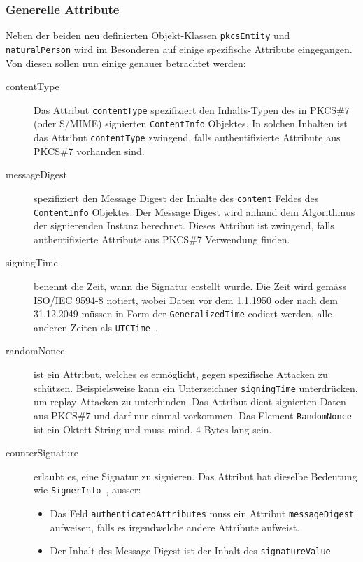 \documentclass[10pt,a4paper]{article}
\begin{document}
\subsubsection{Generelle Attribute}

Neben der beiden neu definierten Objekt-Klassen \texttt{pkcsEntity} und
\texttt{naturalPerson} wird im Besonderen auf einige spezifische Attribute eingegangen.
Von diesen sollen nun einige genauer betrachtet werden:

\begin{description}
    \item[contentType] Das Attribut \texttt{contentType} spezifiziert den Inhalts-Typen
        des in PKCS\#7 (oder S/MIME) signierten \texttt{ContentInfo} Objektes. In solchen
        Inhalten ist das Attribut \texttt{contentType} zwingend, falls authentifizierte
        Attribute aus PKCS\#7 vorhanden sind.
    \item[messageDigest] spezifiziert den Message Digest der Inhalte des \texttt{content}
        Feldes des \texttt{ContentInfo} Objektes. Der Message Digest wird anhand dem
        Algorithmus der signierenden Instanz berechnet. Dieses Attribut ist zwingend,
        falls authentifizierte Attribute aus PKCS\#7 Verwendung finden.
    \item[signingTime] benennt die Zeit, wann die Signatur erstellt wurde. Die Zeit wird
        gemäss ISO/IEC 9594-8 notiert, wobei Daten vor dem 1.1.1950 oder nach dem
        31.12.2049 müssen in Form der \texttt{GeneralizedTime} codiert werden, alle
        anderen Zeiten als \texttt{UTCTime}~\cite[S.12]{pkcs9}.
    \item[randomNonce] ist ein Attribut, welches es ermöglicht, gegen spezifische Attacken
        zu schützen. Beispielsweise kann ein Unterzeichner \texttt{signingTime}
        unterdrücken, um replay Attacken zu unterbinden. Das Attribut dient signierten
        Daten aus PKCS\#7 und darf nur einmal vorkommen. Das Element \texttt{RandomNonce}
        ist ein Oktett-String und muss mind. 4 Bytes lang sein.
    \item[counterSignature] erlaubt es, eine Signatur zu signieren. Das Attribut hat
        dieselbe Bedeutung wie \texttt{SignerInfo}~\cite[S.12]{pkcs7}, ausser:
        \begin{itemize}
            \item Das Feld \texttt{authenticatedAttributes} muss ein Attribut
                \texttt{messageDigest} aufweisen, falls es irgendwelche andere Attribute
                aufweist.
            \item Der Inhalt des Message Digest ist der Inhalt des \texttt{signatureValue}

\end{itemize}
\end{description}
\end{document}
